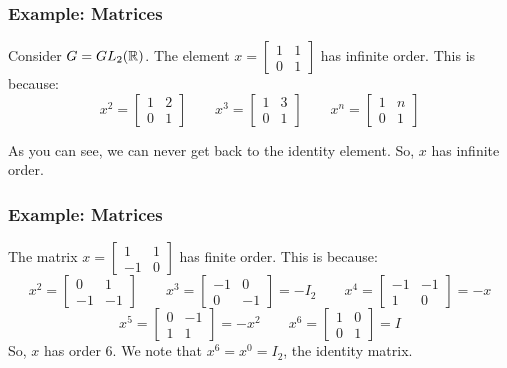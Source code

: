 \documentclass[letterpaper]{article}
\begin{document}
\subsubsection{Example: Matrices}
Consider $G = GL_{2}(\mathbb{R})$. The element $x = \begin{bmatrix}
    1 & 1 \\ 
    0 & 1
\end{bmatrix}$ has infinite order. This is because: 
\[x^2 = \begin{bmatrix}
    1 & 2 \\ 
    0 & 1
\end{bmatrix} \qquad x^3 = \begin{bmatrix}
    1 & 3 \\ 
    0 & 1
\end{bmatrix} \qquad x^n = \begin{bmatrix}
    1 & n \\ 
    0 & 1
\end{bmatrix}\]

As you can see, we can never get back to the identity element. So, $x$ has infinite order. 

\subsubsection{Example: Matrices}
The matrix $x = \begin{bmatrix}
    1 & 1 \\ 
    -1 & 0
\end{bmatrix}$ has finite order. This is because: 
\[x^2 = \begin{bmatrix}
    0 & 1 \\ 
    -1 & -1
\end{bmatrix} \qquad x^3 = \begin{bmatrix}
    -1 & 0 \\ 
    0 & -1
\end{bmatrix} = -I_2 \qquad x^4 = \begin{bmatrix}
    -1 & -1 \\ 
    1 & 0
\end{bmatrix} = -x\]
\[x^5 = \begin{bmatrix}
    0 & -1 \\ 
    1 & 1
\end{bmatrix} = -x^2 \qquad x^6 = \begin{bmatrix}
    1 & 0 \\ 
    0 & 1
\end{bmatrix} = I\]
So, $x$ has order 6. We note that $x^6 = x^0 = I_2$, the identity matrix. 
\end{document}
